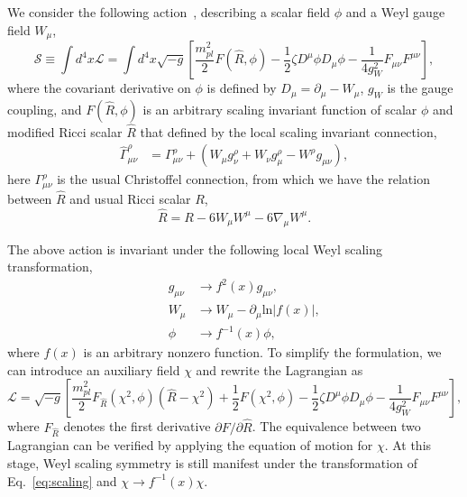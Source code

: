 \documentclass[12pt, a4paper]{article}
\begin{document}
We consider the following action~\cite{Tang:2020ovf}, describing a scalar field $\phi$ and a Weyl gauge field $W_\mu$,
\begin{equation}  \label{eq1}
  \mathcal{S}\equiv \int d^4x \mathcal{L}=\int d^4x \sqrt{-g}\left[\frac{m_{pl}^2}{2}F(\hat{R},\phi)-\frac{1}{2}\zeta D^{\mu}\phi D_{\mu}\phi-\frac{1}{4g^2_{W}}F_{\mu\nu}F^{\mu\nu}\right],
\end{equation}
where the covariant derivative on $\phi$ is defined by $D_{\mu}=\partial_{\mu}-W_{\mu}$, $g_W$ is the gauge coupling, and $F(\hat{R},\phi)$ is an arbitrary scaling invariant function of scalar $\phi$ and modified Ricci scalar $\hat{R}$ that defined by the local scaling invariant connection,
\begin{equation}\label{WGamma}
	\begin{aligned}	\hat{\Gamma}^\rho_{\mu\nu}&=\Gamma^\rho_{\mu\nu}+\left(W_\mu g^\rho_\nu+W_\nu g^\rho_\mu-W^\rho g_{\mu\nu}\right),
	\end{aligned}
\end{equation}
here $\Gamma^\rho_{\mu\nu}$ is the usual Christoffel connection, from which we have the relation between $\hat{R}$ and usual Ricci scalar $R$,
\begin{equation}
	\label{eqHR}
	\hat{R}=R-6W_{\mu}W^{\mu}-6\nabla_{\mu}W^{\mu}.
\end{equation}

The above action is invariant under the following local Weyl scaling transformation,
\begin{equation}\label{eq:scaling}
  \begin{aligned}
    &&g_{\mu\nu} &\rightarrow f^2\left(x\right)g_{\mu\nu}, \\
    &&W_{\mu} &\rightarrow W_{\mu}-\partial_{\mu}\text{ln}|f\left(x\right)|,\\
    &&\phi&\rightarrow f^{-1}\left(x\right)\phi,
  \end{aligned}
\end{equation}
where $f(x)$ is an arbitrary nonzero function. To simplify the formulation, we can introduce an auxiliary field $\chi$ and rewrite the Lagrangian as
\begin{equation}
  \mathcal{L}= \sqrt{-g}\left[\frac{m_{pl}^2}{2}F_{\hat{R}}(\chi^2,\phi) (\hat{R}-\chi^2)+\frac{1}{2}F(\chi^2,\phi)-\frac{1}{2}\zeta D^{\mu}\phi D_{\mu}\phi-\frac{1}{4g^2_{W}}F_{\mu\nu}F^{\mu\nu}\right],
\end{equation}
where $F_{\hat{R}}$ denotes the first derivative $\partial F/\partial\hat R$. The equivalence between two Lagrangian can be verified by applying the equation of motion for $\chi$. At this stage, Weyl scaling symmetry is still manifest under the transformation of Eq.~\ref{eq:scaling} and $\chi \rightarrow f^{-1}\left(x\right) \chi $. 
\end{document}
